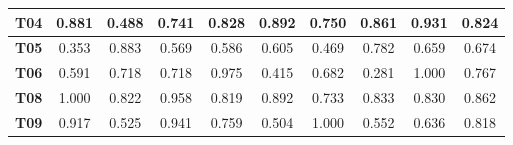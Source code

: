 \begin{table}[htbp]
\begin{tabular}{|c|cccccccc|c|}
		\textbf{T04}                                             & \multicolumn{1}{c|}{0.881}                                & \multicolumn{1}{c|}{0.488}                                & \multicolumn{1}{c|}{0.741}                                & \multicolumn{1}{c|}{0.828}                                & \multicolumn{1}{c|}{0.892}                                & \multicolumn{1}{c|}{0.750}                                & \multicolumn{1}{c|}{0.861}                                & 0.931                        & 0.824                                                 \\ \hline
		\rowcolor[HTML]{F2F2F2} 
		\textbf{T05}                                             & \multicolumn{1}{c|}{\cellcolor[HTML]{F2F2F2}0.353}        & \multicolumn{1}{c|}{\cellcolor[HTML]{F2F2F2}0.883}        & \multicolumn{1}{c|}{\cellcolor[HTML]{F2F2F2}0.569}        & \multicolumn{1}{c|}{\cellcolor[HTML]{F2F2F2}0.586}        & \multicolumn{1}{c|}{\cellcolor[HTML]{F2F2F2}0.605}        & \multicolumn{1}{c|}{\cellcolor[HTML]{F2F2F2}0.469}        & \multicolumn{1}{c|}{\cellcolor[HTML]{F2F2F2}0.782}        & 0.659                        & 0.674                                                 \\ \hline
		\textbf{T06}                                             & \multicolumn{1}{c|}{0.591}                                & \multicolumn{1}{c|}{0.718}                                & \multicolumn{1}{c|}{0.718}                                & \multicolumn{1}{c|}{0.975}                                & \multicolumn{1}{c|}{0.415}                                & \multicolumn{1}{c|}{0.682}                                & \multicolumn{1}{c|}{0.281}                                & 1.000                        & 0.767                                                 \\ \hline
		\rowcolor[HTML]{F2F2F2} 
		\textbf{T08}                                             & \multicolumn{1}{c|}{\cellcolor[HTML]{F2F2F2}1.000}        & \multicolumn{1}{c|}{\cellcolor[HTML]{F2F2F2}0.822}        & \multicolumn{1}{c|}{\cellcolor[HTML]{F2F2F2}0.958}        & \multicolumn{1}{c|}{\cellcolor[HTML]{F2F2F2}0.819}        & \multicolumn{1}{c|}{\cellcolor[HTML]{F2F2F2}0.892}        & \multicolumn{1}{c|}{\cellcolor[HTML]{F2F2F2}0.733}        & \multicolumn{1}{c|}{\cellcolor[HTML]{F2F2F2}0.833}        & 0.830                        & 0.862                                                 \\ \hline
		\textbf{T09}                                             & \multicolumn{1}{c|}{0.917}                                & \multicolumn{1}{c|}{0.525}                                & \multicolumn{1}{c|}{0.941}                                & \multicolumn{1}{c|}{0.759}                                & \multicolumn{1}{c|}{0.504}                                & \multicolumn{1}{c|}{1.000}                                & \multicolumn{1}{c|}{0.552}                                & 0.636                        & 0.818                                                 \\ \hline

\end{tabular}
\end{table}
